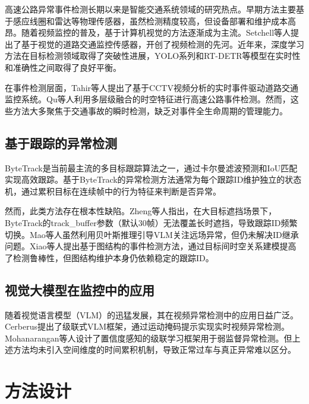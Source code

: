 \documentclass[10.5pt,a4paper,twoside,twocolumn]{ctexart}
\begin{document}
高速公路异常事件检测长期以来是智能交通系统领域的研究热点。早期方法主要基于感应线圈和雷达等物理传感器\cite{chen2001}，虽然检测精度较高，但设备部署和维护成本高昂。随着视频监控的普及，基于计算机视觉的方法逐渐成为主流。Setchell等人\cite{setchell2001}提出了基于视觉的道路交通监控传感器，开创了视频检测的先河。近年来，深度学习方法在目标检测领域取得了突破性进展，YOLO系列\cite{redmon2016}和RT-DETR\cite{zhao2024}等模型在实时性和准确性之间取得了良好平衡。

在事件检测层面，Tahir等人\cite{tahir2023}提出了基于CCTV视频分析的实时事件驱动道路交通监控系统。Qu等人\cite{qu2024}利用多层级融合的时空特征进行高速公路事件检测。然而，这些方法大多聚焦于交通事故的瞬时检测，缺乏对事件全生命周期的管理能力。

\subsection{基于跟踪的异常检测}

ByteTrack\cite{zhang2022}是当前最主流的多目标跟踪算法之一，通过卡尔曼滤波预测和IoU匹配实现高效跟踪。基于ByteTrack的异常检测方法通常为每个跟踪ID维护独立的状态机\cite{liu2024}，通过累积目标在连续帧中的行为特征来判断是否异常。

然而，此类方法存在根本性缺陷。Zheng等人\cite{zheng2025}指出，在大目标遮挡场景下，ByteTrack的track\_buffer参数（默认30帧）无法覆盖长时遮挡，导致跟踪ID频繁切换。Mao等人\cite{mao2026}虽然利用贝叶斯推理引导VLM关注远场异常，但仍未解决ID继承问题。Xiao等人\cite{xiao2023}提出基于图结构的事件检测方法，通过目标间时空关系建模提高了检测鲁棒性，但图结构维护本身仍依赖稳定的跟踪ID。

\subsection{视觉大模型在监控中的应用}

随着视觉语言模型（VLM）的迅猛发展，其在视频异常检测中的应用日益广泛。Cerberus\cite{zheng2025}提出了级联式VLM框架，通过运动掩码提示实现实时视频异常检测。Mohanarangan等人\cite{mohanarangan2026}设计了置信度感知的级联学习框架用于弱监督异常检测。但上述方法均未引入空间维度的时间累积机制，导致正常过车与真正异常难以区分。

\section{\heiti{} 方法设计}
\end{document}
